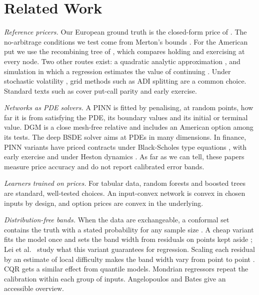 \documentclass[conference]{IEEEtran}
\begin{document}
\section{Related Work}
\emph{Reference pricers.} Our European ground truth is the closed-form price of \cite{black1973pricing}. The no-arbitrage conditions we test come from Merton's bounds \cite{merton1973theory}. For the American put we use the recombining tree of \cite{cox1979option}, which compares holding and exercising at every node. Two other routes exist: a quadratic analytic approximation \cite{baroneadesi1987efficient}, and simulation in which a regression estimates the value of continuing \cite{longstaff2001valuing}. Under stochastic volatility \cite{heston1993closed}, grid methods such as ADI splitting \cite{inthout2010adi} are a common choice. Standard texts such as \cite{hull2022options} cover put-call parity and early exercise.

\emph{Networks as PDE solvers.} A PINN \cite{raissi2019physics} is fitted by penalising, at random points, how far it is from satisfying the PDE, its boundary values and its initial or terminal value. DGM \cite{sirignano2018dgm} is a close mesh-free relative and includes an American option among its tests. The deep BSDE solver \cite{han2018solving} aims at PDEs in many dimensions. In finance, PINN variants have priced contracts under Black-Scholes type equations \cite{bai2022application}, with early exercise \cite{gatta2023meshless} and under Heston dynamics \cite{hainaut2024option}. As far as we can tell, these papers measure price accuracy and do not report calibrated error bands.

\emph{Learners trained on prices.} For tabular data, random forests \cite{ho1995random,breiman2001random} and boosted trees \cite{friedman2001greedy} are standard, well-tested choices. An input-convex network \cite{amos2017input} is convex in chosen inputs by design, and option prices are convex in the underlying.

\emph{Distribution-free bands.} When the data are exchangeable, a conformal set contains the truth with a stated probability for any sample size \cite{vovk2005algorithmic}. A cheap variant fits the model once and sets the band width from residuals on points kept aside \cite{papadopoulos2002inductive}; Lei et al.~\cite{lei2018distribution} study what this variant guarantees for regression. Scaling each residual by an estimate of local difficulty makes the band width vary from point to point \cite{papadopoulos2011regression}. CQR \cite{romano2019conformalized} gets a similar effect from quantile models. Mondrian regressors \cite{bostrom2020mondrian} repeat the calibration within each group of inputs. Angelopoulos and Bates \cite{angelopoulos2023conformal} give an accessible overview.
\end{document}

